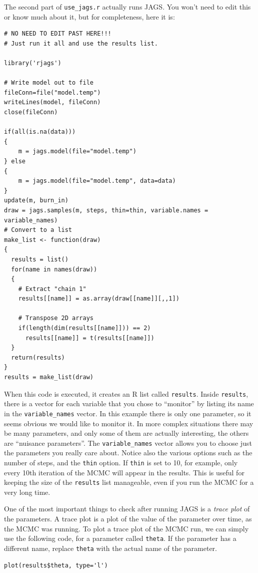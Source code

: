 The second part of {\tt use\_jags.r} actually runs JAGS. You won't need to edit
this or know much about it, but for completeness, here it is:

\begin{verbatim}
# NO NEED TO EDIT PAST HERE!!!
# Just run it all and use the results list.

library('rjags')

# Write model out to file
fileConn=file("model.temp")
writeLines(model, fileConn)
close(fileConn)

if(all(is.na(data)))
{
    m = jags.model(file="model.temp")
} else
{
    m = jags.model(file="model.temp", data=data)
}
update(m, burn_in)
draw = jags.samples(m, steps, thin=thin, variable.names = variable_names)
# Convert to a list
make_list <- function(draw)
{
  results = list()
  for(name in names(draw))
  {
    # Extract "chain 1"
    results[[name]] = as.array(draw[[name]][,,1])
    
    # Transpose 2D arrays
    if(length(dim(results[[name]])) == 2)
      results[[name]] = t(results[[name]])
  }
  return(results)
}
results = make_list(draw)
\end{verbatim}

When this code is executed, it creates an R list called {\tt results}.
Inside {\tt results}, there is a vector
for each variable that you chose to ``monitor'' by listing its name in
the {\tt variable\_names} vector. In this example there is only one parameter,
so it seems obvious we would like to monitor it. In more complex situations there
may be many parameters, and only some of them are actually interesting, the others
are ``nuisance parameters''. The {\tt variable\_names} vector allows you to choose
just the parameters you really care about.
Notice also the various options such as the number of steps, and the {\tt thin}
option. If {\tt thin} is set to 10, for example, only every 10th iteration
of the MCMC will appear in the results. This is useful for keeping the size
of the {\tt results} list manageable, even if you run the MCMC for a very
long time.

One of the most important things to check after running JAGS is a {\it trace
plot} of the parameters. A trace plot is a plot of the value of the parameter
over time, as the MCMC was running.
To plot a trace plot of the MCMC run, we can simply use the following code,
for a parameter called {\tt theta}. If the parameter has a different name,
replace {\tt theta} with the actual name of the parameter.
\begin{verbatim}
plot(results$theta, type='l')
\end{verbatim}

